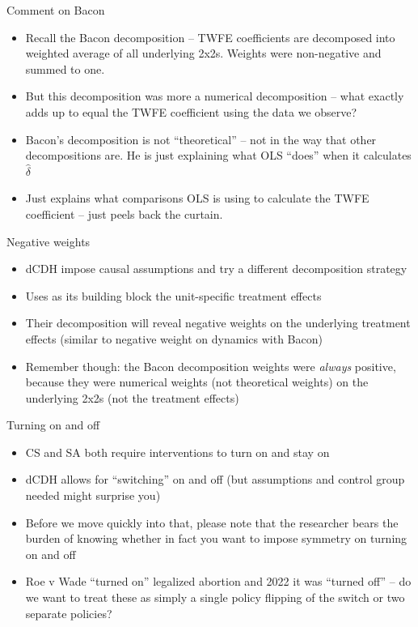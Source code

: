 \documentclass{beamer}
\begin{document}
\begin{frame}{Comment on Bacon}

\begin{itemize}
\item Recall the Bacon decomposition -- TWFE coefficients are decomposed into weighted average of all underlying 2x2s. Weights were non-negative and summed to one.
\item But this decomposition was more a numerical decomposition -- what exactly adds up to equal the TWFE coefficient using the data we observe?
\item Bacon's decomposition is not ``theoretical'' -- not in the way that other decompositions are. He is just explaining what OLS ``does'' when it calculates $\widehat{\delta}$
\item Just explains what comparisons OLS is using to calculate the TWFE coefficient -- just peels back the curtain.
\end{itemize}

\end{frame}

\begin{frame}{Negative weights}

\begin{itemize}
\item dCDH impose causal assumptions and try a different decomposition strategy
\item Uses as its building block the unit-specific treatment effects
\item Their decomposition will reveal negative weights on the underlying treatment effects (similar to negative weight on dynamics with Bacon)
\item Remember though: the Bacon decomposition weights were \emph{always} positive, because they were numerical weights (not theoretical weights) on the underlying 2x2s (not the treatment effects)
\end{itemize}

\end{frame}

\begin{frame}{Turning on and off}

\begin{itemize}
\item CS and SA both require interventions to turn on and stay on
\item dCDH allows for ``switching'' on and off (but assumptions and control group needed might surprise you)
\item Before we move quickly into that, please note that the researcher bears the burden of knowing whether in fact you want to impose symmetry on turning on and off
\item Roe v Wade ``turned on'' legalized abortion and 2022 it was ``turned off'' -- do we want to treat these as simply a single policy flipping of the switch or two separate policies?
\end{itemize}

\end{frame}
\end{document}
